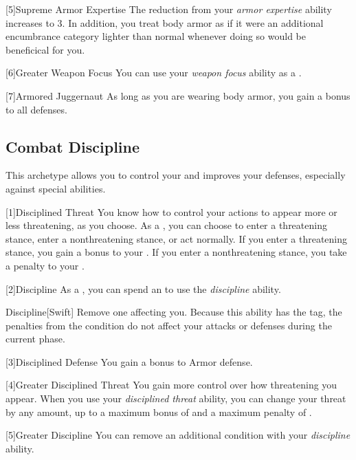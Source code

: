         [5]{Supreme Armor Expertise}
        The  reduction from your \textit{armor expertise} ability increases to 3.
        In addition, you treat body armor as if it were an additional encumbrance category lighter than normal whenever doing so would be beneficical for you.

        [6]{Greater Weapon Focus} You can use your \textit{weapon focus} ability as a .

        [7]{Armored Juggernaut}
        As long as you are wearing body armor, you gain a  bonus to all defenses.

    \subsection{Combat Discipline}
        This archetype allows you to control your  and improves your defenses, especially against special abilities.

        [1]{Disciplined Threat}
        You know how to control your actions to appear more or less threatening, as you choose.
        As a , you can choose to enter a threatening stance, enter a nonthreatening stance, or act normally.
        If you enter a threatening stance, you gain a  bonus to your .
        If you enter a nonthreatening stance, you take a  penalty to your .

        [2]{Discipline} As a , you can spend an  to use the \textit{discipline} ability.
        \begin{ability}{Discipline}[Swift]
            Remove one  affecting you.
            Because this ability has the  tag, the penalties from the condition do not affect your attacks or defenses during the current phase.
        \end{ability}

        [3]{Disciplined Defense}
        You gain a  bonus to Armor defense.

        [4]{Greater Disciplined Threat}
        You gain more control over how threatening you appear.
        When you use your \textit{disciplined threat} ability, you can change your threat by any amount, up to a maximum bonus of  and a maximum penalty of .

        [5]{Greater Discipline}
        You can remove an additional condition with your \textit{discipline} ability.

